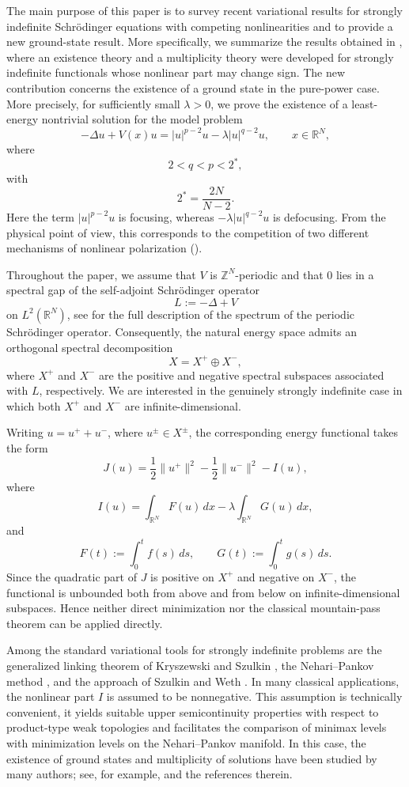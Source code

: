 \documentclass[11pt]{amsart}
\numberwithin{equation}{section}
\theoremstyle{definition}
\begin{document}
The main purpose of this paper is to survey recent variational results for
strongly indefinite Schr\"odinger equations with competing nonlinearities and to provide a new ground-state result.
More specifically, we summarize the results obtained in
\cite{BB2022,BBS2025}, where an existence theory and a multiplicity theory
were developed for strongly indefinite functionals whose nonlinear part may
change sign. The new contribution concerns the existence of a ground state in the
pure-power case. More precisely, for sufficiently small $\lambda>0$, we
prove the existence of a least-energy nontrivial solution for the model
problem
\begin{equation}\label{eq:pure-power-problem}
-\Delta u+V(x)u
=
|u|^{p-2}u-\lambda |u|^{q-2}u,
\qquad x\in\mathbb{R}^N,
\end{equation}
where
\[
2<q<p<2^*,
\]
with
\[
2^*=
\dfrac{2N}{N-2}.
\]
Here the term $|u|^{p-2}u$ is focusing, whereas
$-\lambda |u|^{q-2}u$ is defocusing. From the physical point of view,
this corresponds to the competition of two different mechanisms of
nonlinear polarization (\cite{Slusher}).

Throughout the paper, we assume that $V$ is $\mathbb{Z}^N$-periodic and
that $0$ lies in a spectral gap of the self-adjoint Schr\"odinger operator
\[
L:=-\Delta+V
\]
on $L^2(\mathbb{R}^N)$, see \cite{ReedSimon} for the full description of the spectrum of the periodic Schr\"odinger operator. Consequently, the natural energy space admits an
orthogonal spectral decomposition
\[
X=X^+\oplus X^-,
\]
where $X^+$ and $X^-$ are the positive and negative spectral subspaces
associated with $L$, respectively. We are interested in the genuinely
strongly indefinite case in which both $X^+$ and $X^-$ are
infinite-dimensional.

Writing $u=u^++u^-$, where $u^\pm\in X^\pm$, the corresponding energy
functional takes the form
\begin{equation}
J(u)
=
\frac{1}{2}\|u^+\|^2
-
\frac{1}{2}\|u^-\|^2
-
I(u),
\end{equation}
where
\[
I(u)
=
\int_{\mathbb{R}^N}F(u)\,dx
-
\lambda\int_{\mathbb{R}^N}G(u)\,dx,
\]
and
\[
F(t):=\int_0^t f(s)\,ds,
\qquad
G(t):=\int_0^t g(s)\,ds.
\]
Since the quadratic part of $J$ is positive on $X^+$ and negative on
$X^-$, the functional is unbounded both from above and from below on
infinite-dimensional subspaces. Hence neither direct minimization nor the
classical mountain-pass theorem \cite{AmbrosettiRabinowitz} can be applied directly.

Among the standard variational tools for strongly indefinite problems are
the generalized linking theorem of Kryszewski and Szulkin \cite{KS}, the
Nehari--Pankov method \cite{Pankov}, and the approach of Szulkin and Weth
\cite{SW}. In many classical applications, the nonlinear part $I$ is
assumed to be nonnegative. This assumption is technically convenient, it
yields suitable upper semicontinuity properties with respect to
product-type weak topologies and facilitates the comparison of minimax
levels with minimization levels on the Nehari--Pankov manifold. In this case, the existence of ground states and multiplicity of solutions have been studied by many authors; see, for example, \cite{Li,Liu,Mederski2016,Rabinowitz,dePaiva} and the references therein.
\end{document}
